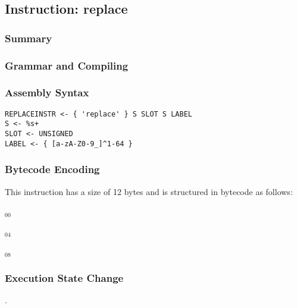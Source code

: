 \subsection{Instruction: replace}

\subsubsection{Summary}


\subsubsection{Grammar and Compiling}


\subsubsection{Assembly Syntax}

\begin{myquote}
\begin{verbatim}
REPLACEINSTR <- { 'replace' } S SLOT S LABEL
S <- %s+
SLOT <- UNSIGNED
LABEL <- { [a-zA-Z0-9_]^1-64 }
\end{verbatim}
\end{myquote}


\subsubsection{Bytecode Encoding}

This instruction has a size of 12 bytes and is structured in bytecode as follows:

$_{00}$\ 



$_{04}$\ 



$_{08}$\ 
\fbox{%
  \parbox{20pt}{%
00
  }%
}


\subsubsection{Execution State Change}

.



